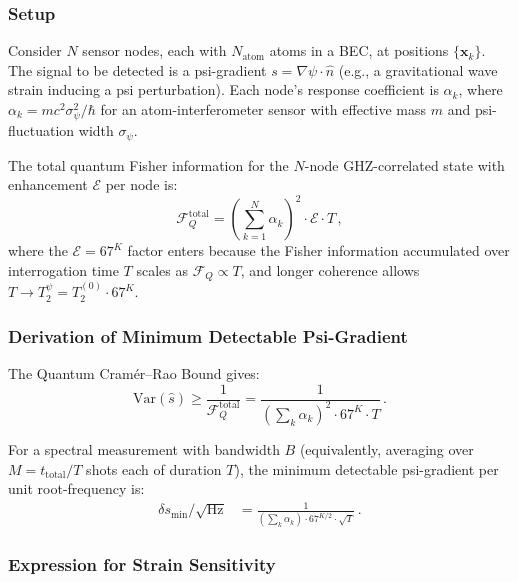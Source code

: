 \documentclass[11pt]{article}
\theoremstyle{definition}
\theoremstyle{remark}
\begin{document}
\subsubsection{Setup}

Consider $N$ sensor nodes, each with $N_{\mathrm{atom}}$ atoms in a BEC, at
positions $\{\mathbf{x}_k\}$. The signal to be detected is a psi-gradient
$s = \nabla\psi \cdot \hat{n}$ (e.g., a gravitational wave strain inducing a
psi perturbation). Each node's response coefficient is $\alpha_k$, where
$\alpha_k = mc^2 \sigma_\psi^2 / \hbar$ for an atom-interferometer sensor
with effective mass $m$ and psi-fluctuation width $\sigma_\psi$.

The total quantum Fisher information for the $N$-node GHZ-correlated state with
enhancement $\mathcal{E}$ per node is:
\begin{equation}
\mathcal{F}_Q^{\mathrm{total}} = \left(\sum_{k=1}^N \alpha_k\right)^2
\cdot \mathcal{E} \cdot T\,,
\label{eq:total-QFI}
\end{equation}
where the $\mathcal{E} = 67^K$ factor enters because the Fisher information
accumulated over interrogation time $T$ scales as $\mathcal{F}_Q \propto T$,
and longer coherence allows $T \to T_2^\psi = T_2^{(0)} \cdot 67^K$.

\subsubsection{Derivation of Minimum Detectable Psi-Gradient}

The Quantum Cramér--Rao Bound gives:
\begin{equation}
\mathrm{Var}(\hat{s}) \geq \frac{1}{\mathcal{F}_Q^{\mathrm{total}}} =
\frac{1}{\left(\sum_k \alpha_k\right)^2 \cdot 67^K \cdot T}\,.
\label{eq:qcrb-psi}
\end{equation}

For a spectral measurement with bandwidth $B$ (equivalently, averaging over
$M = t_{\mathrm{total}}/T$ shots each of duration $T$), the minimum detectable
psi-gradient per unit root-frequency is:
\begin{align}
\delta s_{\min}\bigg/\sqrt{\mathrm{Hz}} &=
\frac{1}{\left(\sum_k \alpha_k\right) \cdot 67^{K/2} \cdot \sqrt{T}}\,.
\label{eq:delta-s-min}
\end{align}

\subsubsection{Expression for Strain Sensitivity}
\end{document}
